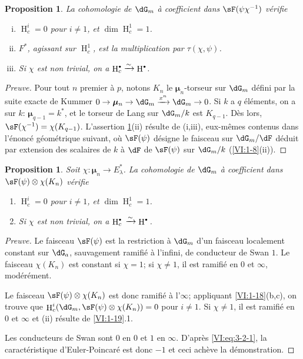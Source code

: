 \documentclass[oneside]{book}
\DeclareMathOperator{\h}{H}
\newcommand{\dmu}{{\bm\mu}}
\newcommand{\iso}{\xrightarrow\sim}
\theoremstyle{sga-source}
\theoremstyle{sga-source-dash}
\theoremstyle{sga-source-dotdash}
\theoremstyle{sga-source-number-note-dash}
\theoremstyle{sga-source-note-number-dotdash}
\theoremstyle{sga-source-example-dotdash}
\theoremstyle{sga-source-inline-number}
\theoremstyle{sga-source-bare-number}
\theoremstyle{sga-source}
\newtheorem{proposition_}[subsection]{Proposition}
\let\oldbullet\bullet
\renewcommand{\bullet}{\textnormal{\tiny$\oldbullet$}}
\newcommand{\PrintPage}[1]{}\newcommand{\MathPage}[1]{}\newcommand{\PrintCite}[2]{#1}\newcommand{\var}[3]{#1}
\begin{document}
\begin{proposition_}\label{VI:4-2}
La cohomologie de $\dG_m$ à coefficient dans $\sF(\psi\chi^{-1})$ vérifie 
\begin{enumerate}[(i)]
  \item $\h_c^i=0$ pour $i\ne 1$, et $\dim \h_c^1=1$. 
  \item $F^\ast$, agissant sur $\h_c^1$, est la multiplication par 
    $\tau(\chi,\psi)$. 
  \item Si $\chi$ est non trivial, on a $\h_c^\bullet \iso \h^\bullet$. 
\end{enumerate}
\end{proposition_}
\begin{proof}[Preuve]
Pour tout $n$ premier à $p$, notons $K_n$ le $\dmu_n$-torseur sur $\dG_m$ 
défini par la suite exacte de Kummer 
$0 \to \dmu_n \to \dG_m \xrightarrow{x^n} \dG_m \to 0$. Si $k$ a $q$ 
éléments, on a sur $k$: $\dmu_{q-1}=k^\ast$, et le torseur de Lang sur 
$\dG_m/k$ est $K_{q-1}$. Dès lors, $\sF(\chi^{-1})=\chi(K_{q-1})$. 
L'assertion \ref{VI:4-2}(ii) résulte de (i,iii), eux-mêmes contenus dans 
l'énoncé géométrique suivant, où $\sF(\psi)$ désigne le faisceau 
sur $\dG_m/\dF$ déduit par extension des scalaires de $k$ à $\dF$ de 
$\sF(\psi)$ sur $\dG_m/k$ (\ref{VI:1-8}(ii)). 
\end{proof}





\begin{proposition_}\label{VI:4-3}
Soit $\chi:\dmu_n \to E_\lambda^\ast$. La cohomologie de $\dG_m$ à 
coefficient dans $\sF(\psi)\otimes \chi(K_n)$ vérifie 
\begin{enumerate}[\indent (i)]
  \item $\h_c^i=0$ pour $i\ne 1$, et $\dim \h_c^1{} = 1$. 
  \item Si $\chi$ est non trivial, on a $\h_c^\bullet{}\iso \h^\bullet{}$. 
\end{enumerate}
\end{proposition_}
\PrintPage{197}
\begin{proof}[Preuve]
Le faisceau $\sF(\psi)$ est la restriction à $\dG_m$ d'un faisceau localement 
constant sur $\dG_a$, sauvagement ramifié à l'infini, de conducteur de 
Swan $1$. Le faisceau $\chi(K_n)$ est constant si $\chi=1$; si $\chi\ne 1$, il 
est ramifié en $0$ et $\infty$, modérément. 

Le faisceau $\sF(\psi)\otimes\chi(K_n)$ est donc ramifié à l'$\infty$; 
appliquant \ref{VI:1-18}(b,c), on trouve que 
$\h_c^i(\dG_m,\sF(\psi)\otimes \chi(K_n))=0$ pour $i\ne 1$. Si $\chi\ne 1$, il 
est ramifié en $0$ et $\infty$ et (ii) résulte de \ref{VI:1-19}.1. 

Les conducteurs de Swan sont $0$ en $0$ et $1$ en $\infty$. D'après 
\eqref{VI:eq:3-2-1}, la caractéristique d'Euler-Poincaré est donc $-1$ et 
ceci achève la démonstration. 
\end{proof}
\end{document}
